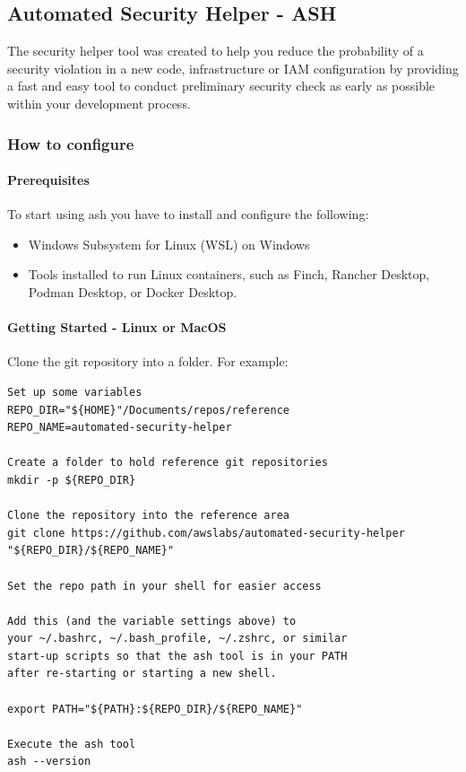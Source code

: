 \documentclass[]{article}
\begin{document}
\subsection{Automated Security Helper - ASH}
The security helper tool was created to help you reduce the probability of a security violation in a new code, infrastructure or IAM configuration by providing a fast and easy tool to conduct preliminary security check as early as possible within your development process.

\subsubsection{How to configure}
\paragraph{Prerequisites} 
To start using ash you have to install and configure the following:
\begin{itemize}
\item Windows Subsystem for Linux (WSL) on Windows 
\item Tools installed to run Linux containers, such as Finch, Rancher Desktop, Podman Desktop, or Docker Desktop.
\end{itemize}

\paragraph{Getting Started - Linux or MacOS} 
Clone the git repository into a folder. For example:

\begin{lstlisting}
Set up some variables
REPO_DIR="${HOME}"/Documents/repos/reference
REPO_NAME=automated-security-helper

Create a folder to hold reference git repositories
mkdir -p ${REPO_DIR}

Clone the repository into the reference area
git clone https://github.com/awslabs/automated-security-helper "${REPO_DIR}/${REPO_NAME}"

Set the repo path in your shell for easier access

Add this (and the variable settings above) to
your ~/.bashrc, ~/.bash_profile, ~/.zshrc, or similar
start-up scripts so that the ash tool is in your PATH
after re-starting or starting a new shell.

export PATH="${PATH}:${REPO_DIR}/${REPO_NAME}"

Execute the ash tool
ash --version
\end{lstlisting}
\end{document}
